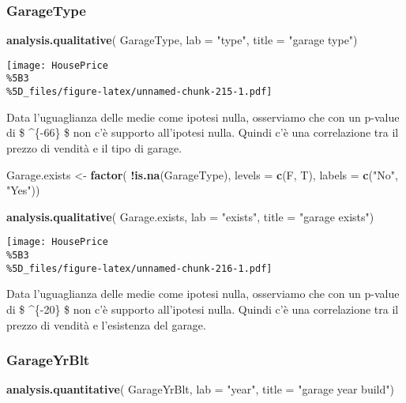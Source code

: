\documentclass[
]{article}
\newenvironment{Shaded}{\begin{snugshade}}{\end{snugshade}}
\newcommand{\AttributeTok}[1]{\textcolor[rgb]{0.13,0.29,0.53}{#1}}
\newcommand{\FunctionTok}[1]{\textcolor[rgb]{0.13,0.29,0.53}{\textbf{#1}}}
\newcommand{\NormalTok}[1]{#1}
\newcommand{\OtherTok}[1]{\textcolor[rgb]{0.56,0.35,0.01}{#1}}
\newcommand{\SpecialCharTok}[1]{\textcolor[rgb]{0.81,0.36,0.00}{\textbf{#1}}}
\newcommand{\StringTok}[1]{\textcolor[rgb]{0.31,0.60,0.02}{#1}}
\begin{document}
\subsubsection{GarageType}\label{garagetype-1}

\begin{Shaded}
\begin{Highlighting}[]
\FunctionTok{analysis.qualitative}\NormalTok{(}
\NormalTok{    GarageType,}
    \AttributeTok{lab =} \StringTok{"type"}\NormalTok{,}
    \AttributeTok{title =} \StringTok{"garage type"}\NormalTok{)}
\end{Highlighting}
\end{Shaded}

\texttt{[image: HousePrice\\\%5B3\\\%5D\_files/figure-latex/unnamed-chunk-215-1.pdf]}

Data l'uguaglianza delle medie come ipotesi nulla, osserviamo che con un
p-value di \$ \^{}\{-66\} \$ non c'è supporto all'ipotesi
nulla. Quindi c'è una correlazione tra il prezzo di vendità e il tipo di
garage.

\begin{Shaded}
\begin{Highlighting}[]
\NormalTok{Garage.exists }\OtherTok{\textless{}{-}} \FunctionTok{factor}\NormalTok{(}
    \SpecialCharTok{!}\FunctionTok{is.na}\NormalTok{(GarageType),}
    \AttributeTok{levels =} \FunctionTok{c}\NormalTok{(F, T), }
    \AttributeTok{labels =} \FunctionTok{c}\NormalTok{(}\StringTok{"No"}\NormalTok{, }\StringTok{"Yes"}\NormalTok{))}

\FunctionTok{analysis.qualitative}\NormalTok{(}
\NormalTok{    Garage.exists,}
    \AttributeTok{lab =} \StringTok{"exists"}\NormalTok{,}
    \AttributeTok{title =} \StringTok{"garage exists"}\NormalTok{)}
\end{Highlighting}
\end{Shaded}

\texttt{[image: HousePrice\\\%5B3\\\%5D\_files/figure-latex/unnamed-chunk-216-1.pdf]}

Data l'uguaglianza delle medie come ipotesi nulla, osserviamo che con un
p-value di \$ \^{}\{-20\} \$ non c'è supporto all'ipotesi
nulla. Quindi c'è una correlazione tra il prezzo di vendità e
l'esistenza del garage.

\subsubsection{GarageYrBlt}\label{garageyrblt-1}

\begin{Shaded}
\begin{Highlighting}[]
\FunctionTok{analysis.quantitative}\NormalTok{(}
\NormalTok{    GarageYrBlt,}
    \AttributeTok{lab =} \StringTok{"year"}\NormalTok{,}
    \AttributeTok{title =} \StringTok{"garage year build"}\NormalTok{)}
\end{Highlighting}
\end{Shaded}
\end{document}
